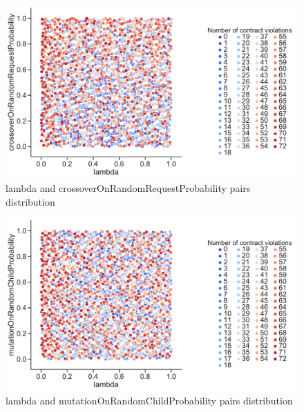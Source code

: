 \begin{figure}
	\centering
	\includegraphics[width=\textwidth]{images/PairsDistr/lambda_crossoverOnRandomRequestProbability.pdf}
	\caption[lambda and crossoverOnRandomRequestProbability pairs distribution]{lambda and crossoverOnRandomRequestProbability pairs distribution}
	\label{fig:lambda_crossoverOnRandomRequestProbability_pair}
\end{figure}
\clearpage
\begin{figure}
	\centering
	\includegraphics[width=\textwidth]{images/PairsDistr/lambda_mutationOnRandomChildProbability.pdf}
	\caption[lambda and mutationOnRandomChildProbability pairs distribution]{lambda and mutationOnRandomChildProbability pairs distribution}
	\label{fig:lambda_mutationOnRandomChildProbability_pair}
\end{figure}
\clearpage
